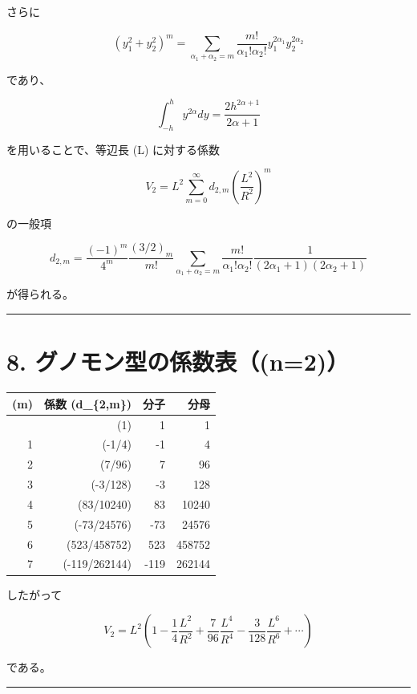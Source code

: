 \documentclass[
  12pt,
  a4paper,
]{article}
\newcounter{none} %
\begin{document}
さらに

\[
(y_1^2+y_2^2)^m =
\sum_{\alpha_1+\alpha_2=m}
\frac{m!}{\alpha_1!\alpha_2!}
y_1^{2\alpha_1}y_2^{2\alpha_2}
\]

であり、

\[
\int_{-h}^h y^{2\alpha}dy =
\frac{2h^{2\alpha+1}}{2\alpha+1}
\]

を用いることで、等辺長 (L) に対する係数

\[
V_2=L^2\sum_{m=0}^\infty d_{2,m}\left(\frac{L^2}{R^2}\right)^m
\]

の一般項

\[
\boxed{
d_{2,m} =
\frac{(-1)^m}{4^m}
\frac{(3/2)_m}{m!}
\sum_{\alpha_1+\alpha_2=m}
\frac{m!}{\alpha_1!\alpha_2!}
\frac{1}{(2\alpha_1+1)(2\alpha_2+1)}
}
\]

が得られる。

\begin{center}\rule{0.5\linewidth}{0.5pt}\end{center}

\section{8.
グノモン型の係数表（(n=2)）}\label{ux30b0ux30ceux30e2ux30f3ux578bux306eux4fc2ux6570ux8868n2}

{\def\LTcaptype{none} %
\begin{longtable}[]{@{}rrrr@{}}
\toprule\noalign{}
(m) & 係数 (d\_\{2,m\}) & 分子 & 分母 \\
\midrule\noalign{}
\endhead
\bottomrule\noalign{}
\endlastfoot
0 & (1) & 1 & 1 \\
1 & (-1/4) & -1 & 4 \\
2 & (7/96) & 7 & 96 \\
3 & (-3/128) & -3 & 128 \\
4 & (83/10240) & 83 & 10240 \\
5 & (-73/24576) & -73 & 24576 \\
6 & (523/458752) & 523 & 458752 \\
7 & (-119/262144) & -119 & 262144 \\
\end{longtable}
}

したがって

\[
V_2 =
L^2\left(
1
-\frac14\frac{L^2}{R^2}
+\frac7{96}\frac{L^4}{R^4}
-\frac3{128}\frac{L^6}{R^6}
+\cdots
\right)
\]

である。

\begin{center}\rule{0.5\linewidth}{0.5pt}\end{center}
\end{document}

